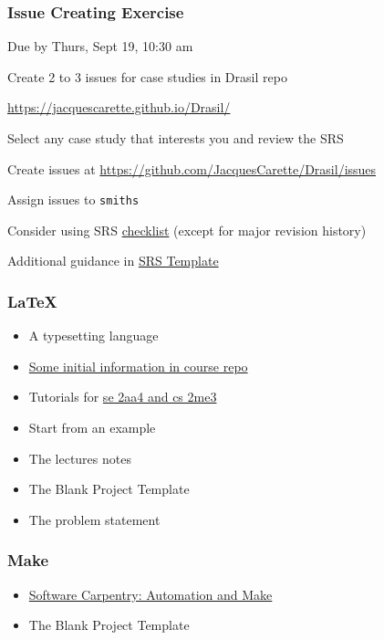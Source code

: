 \documentclass[t,12pt,numbers,fleqn]{beamer}
\begin{document}
\begin{frame}
\frametitle{Issue Creating Exercise}

\bi
\item Due by Thurs, Sept 19, 10:30 am
\item Create 2 to 3 issues for case studies in Drasil repo
\item \href{https://jacquescarette.github.io/Drasil/}
  {https://jacquescarette.github.io/Drasil/}
\item Select any case study that interests you and review the SRS
\item Create issues at \href{https://github.com/JacquesCarette/Drasil/issues}
  {https://github.com/JacquesCarette/Drasil/issues}
\item Assign issues to \texttt{smiths}
\item Consider using SRS
  \href{https://gitlab.cas.mcmaster.ca/smiths/cas741/blob/master/BlankProjectTemplate/docs/SRS/SRS-Checklist.pdf}
  {checklist} (except for major revision history)
\item Additional guidance in
  \href{https://gitlab.cas.mcmaster.ca/smiths/cas741/blob/master/BlankProjectTemplate/docs/SRS/SRS.tex}
  {SRS Template}
\ei

\end{frame}


\begin{frame}
\frametitle{LaTeX}
\begin{itemize}
\item A typesetting language
\item
  \href{https://gitlab.cas.mcmaster.ca/smiths/cas741/tree/master/ToolTutorials/LaTeX}
  {Some initial information in course repo}
\item Tutorials for
  \href{https://gitlab.cas.mcmaster.ca/smiths/se2aa4_cs2me3/tree/master/Tutorials/T02a-LaTeX}
  {se 2aa4 and cs 2me3}
\item Start from an example
\bi
\item The lectures notes
\item The Blank Project Template
\item The problem statement
\ei
\end{itemize}
\end{frame}


\begin{frame}
\frametitle{Make}
\begin{itemize}
\item \href{https://swcarpentry.github.io/make-novice/} {Software Carpentry:
    Automation and Make}
\item The Blank Project Template
\end{itemize}
\end{frame}
\end{document}
